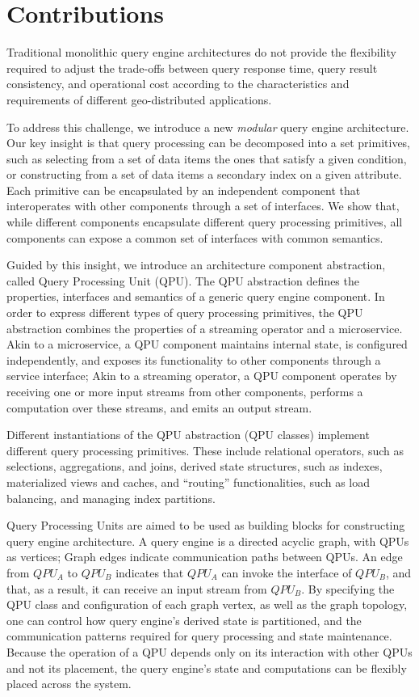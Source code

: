 \section{Contributions}

Traditional monolithic query engine architectures do not provide the flexibility required to adjust the trade-offs
between query response time, query result consistency, and operational cost according to the characteristics and
requirements of different geo-distributed applications.

To address this challenge, we introduce a new \textit{modular} query engine architecture.
Our key insight is that query processing can be decomposed into a set primitives,
such as selecting from a set of data items the ones that satisfy a given condition,
or constructing from a set of data items a secondary index on a given attribute.
Each primitive can be encapsulated by an independent component that interoperates with other components through a set of interfaces.
We show that, while different components encapsulate different query processing primitives,
all components can expose a common set of interfaces with common semantics.

Guided by this insight,
we introduce an architecture component abstraction, called Query Processing Unit (QPU).
The QPU abstraction defines the properties, interfaces and semantics of a generic query engine component.
In order to express different types of query processing primitives,
the QPU abstraction combines the properties of a streaming operator and a microservice.
Akin to a microservice, a QPU component maintains internal state, is configured independently, and exposes its functionality to other components through a service interface;
Akin to a streaming operator, a QPU component operates by receiving one or more input streams from other components,
performs a computation over these streams, and emits an output stream.

Different instantiations of the QPU abstraction (QPU classes) implement different query processing primitives.
These include relational operators, such as selections, aggregations, and joins,
derived state structures, such as indexes, materialized views and caches,
and ``routing'' functionalities, such as load balancing, and managing index partitions.

Query Processing Units are aimed to be used as building blocks for constructing query engine architecture.
A query engine is a directed acyclic graph, with QPUs as vertices;
Graph edges indicate communication paths between QPUs.
An edge from $QPU_A$ to $QPU_B$ indicates that $QPU_A$ can invoke the interface of $QPU_B$,
and that, as a result, it can receive an input stream from $QPU_B$.
By specifying the QPU class and configuration of each graph vertex, as well as the graph topology,
one can control how query engine's derived state is partitioned,
and the communication patterns required for query processing and state maintenance.
Because the operation of a QPU depends only on its interaction with other QPUs and not its placement,
the query engine's state and computations can be flexibly placed across the system.

